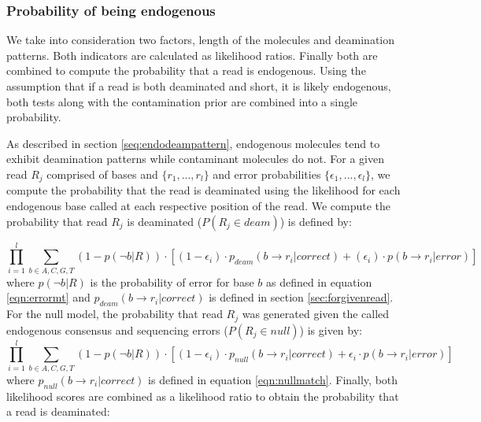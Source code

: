\documentclass[a4paper,12pt]{article}
\begin{document}
\subsubsection{Probability of being endogenous}
\label{sec:priorendo}

We take into consideration two factors, length of the molecules and deamination patterns. Both indicators are calculated as likelihood ratios. Finally both are combined to compute the probability that a read is endogenous. Using the assumption that if a read is both deaminated and short, it is likely endogenous, both tests along with the contamination prior are combined into a single probability. 


As described in section \ref{seq:endodeampattern}, endogenous molecules tend to exhibit deamination patterns while contaminant molecules do not. For a given read $R_j$ comprised of bases and $\{ r_1, ..., r_l \}$ and error probabilities $\{ \epsilon_1, ..., \epsilon_l \}$, we compute the probability that the read is deaminated using the likelihood for each endogenous base called at each respective position of the read. We compute the probability that read $R_j$ is deaminated ($P(R_j \in deam) $) is defined by:

{\small
\begin{equation}
 \prod_{i=1}^{l} \sum_{b \in {A,C,G,T} }  (1-p(\neg b|R)) \cdot 
[ (1-\epsilon_i) \cdot p_{deam}(b \to r_i | correct)
  + 
  (\epsilon_i) \cdot p(b \to r_i | error)  
]
\end{equation} 
}
\noindent where $p(\neg b|R)$ is the probability of error for base $b$ as defined in equation \ref{eqn:errormt} and $p_{deam}(b \to r_i | correct)$  is defined in section \ref{sec:forgivenread}. For the null model, the probability that read $R_j$ was generated given the called endogenous consensus and sequencing errors ($P(R_j \in null) $) is given by:
{\small
\begin{equation}
\prod_{i=1}^{l} \sum_{b \in {A,C,G,T} } (1-p(\neg b|R)) \cdot 
[ (1-\epsilon_i) \cdot p_{null}(b \to r_i | correct)
  + 
  \epsilon_i \cdot p(b \to r_i | error) ]
\end{equation} 
}
\noindent where $p_{null}(b \to r_i | correct)$  is defined in equation \ref{eqn:nullmatch}. Finally, both likelihood scores are combined as a likelihood ratio to obtain the probability that a read is deaminated:
\end{document}
